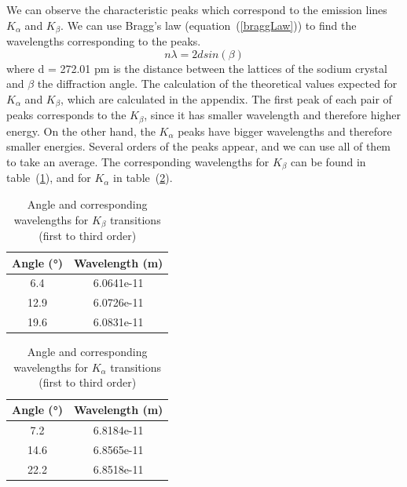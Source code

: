 \documentclass{scrartcl}
\begin{document}
\noindent We can observe the characteristic peaks which correspond to the emission lines $K_{\alpha}$ and $K_{\beta}$. We can use Bragg's law (equation~(\ref{braggLaw})) \cite{braggLaw} to find the wavelengths corresponding to the peaks. \begin{equation}n\lambda = 2dsin(\beta) \label{braggLaw}\end{equation} where d = 272.01 pm is the distance between the lattices of the sodium crystal and $\beta$ the diffraction angle. The calculation of the theoretical values expected for $K_\alpha$ and $K_\beta$, which are calculated in the appendix. The first peak of each pair of peaks corresponds to the $K_\beta$, since it has smaller wavelength and therefore higher energy. On the other hand, the $K_\alpha$ peaks have bigger wavelengths and therefore smaller energies. Several orders of the peaks appear, and we can use all of them to take an average.
The corresponding wavelengths for $K_\beta$ can be found in table~(\ref{tab:kBetaWavelength}), and for $K_\alpha$ in table~(\ref{tab:kAlphaWavelength}).

\begin{table}[!ht]
    \centering
    \begin{tabular}{c|c}
    Angle (°) & Wavelength (m) \\ \hline 
    6.4  & 6.0641e-11 \\ 
    12.9 & 6.0726e-11 \\
    19.6 & 6.0831e-11 \\
    \end{tabular} 
    \caption{ Angle and corresponding wavelengths for $K_{\beta} $ transitions (first to third order)}
    \label{tab:kBetaWavelength}
\end{table}
\FloatBarrier

\begin{table}[!ht]
    \centering
    \begin{tabular}{c|c}
    Angle (°) & Wavelength (m) \\ \hline 
    7.2  & 6.8184e-11 \\
    14.6 & 6.8565e-11 \\
    22.2 & 6.8518e-11 \\
\end{tabular}
    \caption{Angle and corresponding wavelengths for $K_{\alpha} $ transitions (first to third order)}
    \label{tab:kAlphaWavelength}
\end{table}
\FloatBarrier
\end{document}
